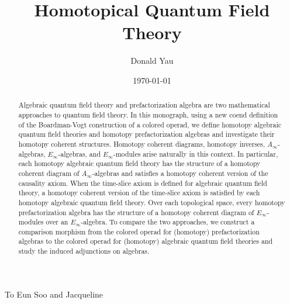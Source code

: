 \documentclass[11pt]{amsbook}
\numberwithin{section}{chapter}
\numberwithin{subsection}{section}
\numberwithin{equation}{section}
\theoremstyle{plain}
\theoremstyle{definition}
\begin{document}
\title{Homotopical Quantum Field Theory}

\author{Donald Yau}
\address{Department of Mathematics\\
	 The Ohio State University at Newark\\
	 1179 University Drive\\ 
	 Newark, OH 43055, USA}


\begin{abstract}
Algebraic quantum field theory and prefactorization algebra are two mathematical approaches to quantum field theory.  In this monograph, using a new coend definition of the Boardman-Vogt construction of a colored operad, we define homotopy algebraic quantum field theories and homotopy prefactorization algebras and investigate their homotopy coherent structures.  Homotopy coherent diagrams, homotopy inverses, $A_\infty$-algebras, $E_\infty$-algebras, and $E_\infty$-modules arise naturally in this context.  In particular, each homotopy algebraic quantum field theory has the structure of a homotopy coherent diagram of $A_\infty$-algebras and satisfies a homotopy coherent version of the causality axiom.  When the time-slice axiom is defined for algebraic quantum field theory, a homotopy coherent version of the time-slice axiom is satisfied by each homotopy algebraic quantum field theory.  Over each topological space, every homotopy prefactorization algebra has the structure of a homotopy coherent diagram of $E_\infty$-modules over an $E_\infty$-algebra.  To compare the two approaches, we construct a comparison morphism from the colored operad for (homotopy) prefactorization algebras to the colored operad for (homotopy) algebraic quantum field theories and study the induced adjunctions on algebras.
\end{abstract}


\date{\today}

\maketitle

\cleardoublepage
\thispagestyle{empty}
\vspace*{13.5pc}
\begin{center}
To Eun Soo and Jacqueline
\end{center}
\cleardoublepage
\end{document}
